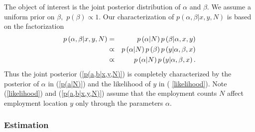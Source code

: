 The object of interest is the joint posterior distribution of $\alpha $ and $%
\beta .$ We assume a uniform prior on $\beta ,$ $p\left( \beta \right)
\varpropto 1.$ Our characterization of $p\left( \alpha ,\beta |x,y,N\right) $
is based on the factorization 
\begin{eqnarray}
p\left( \alpha ,\beta |x,y,N\right) &=&p\left( \alpha |N\right) p\left(
\beta |\alpha ,x,y\right)  \notag \\
&\varpropto &p\left( \alpha |N\right) p\left( \beta \right) p\left( y|\alpha
,\beta ,x\right)  \notag \\
&\varpropto &p\left( \alpha |N\right) p\left( y|\alpha ,\beta ,x\right) .
\label{p(a,b|x,y,N)}
\end{eqnarray}
Thus the joint posterior (\ref{p(a,b|x,y,N)}) is completely characterized by
the posterior of $\alpha $ in (\ref{p(a|N)}) and the likelihood of $y$ in (%
\ref{likelihood}). Note (\ref{likelihood}) and (\ref{p(a,b|x,y,N)}) assume
that the employment counts $N$ affect employment location $y$ only through
the parameters $\alpha .$

\subsubsection{Estimation}

